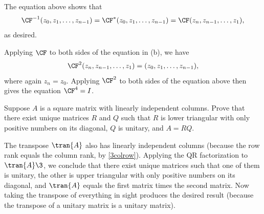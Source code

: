 \begin{Solution}
\begin{subtheorem}
The equation above shows that
\[
\CF^{-1}(z_0, z_1, \ldots, z_{n-1}) = \CF^*(z_0, z_1, \ldots, z_{n-1}) = \CF(z_n, z_{n-1}, \ldots, z_1),
\]
as desired.

\item
Applying $\CF$ to both sides of the equation in (b), we have
\[
\CF^2(z_n, z_{n-1}, \ldots, z_1) = (z_0, z_1, \ldots, z_{n-1}),
\]
where again $z_n = z_0$. Applying $\CF^2$ to both sides of the equation above then gives the equation $\CF^4 = I$.

\end{subtheorem}

\end{Solution}

\exercise
Suppose $A$ is a square matrix with linearly independent columns. Prove that there exist unique matrices $R$ and $Q$ such that $R$ is lower triangular with only positive numbers on its diagonal, $Q$ is unitary, and $A = RQ$.\label{7Cholt}

\begin{Solution}
The transpose $\tran{A}$ also has linearly independent columns (because the row rank equals the column rank, by \ref{3colrow}). Applying the QR factorization to $\tran{A}\3$, we conclude that there exist unique matrices such that one of them is unitary, the other is upper triangular with only positive numbers on its diagonal, and $\tran{A}$ equals the first matrix times the second matrix. Now taking the transpose of everything in sight produces the desired result (because the transpose of a unitary matrix is a unitary matrix).
\end{Solution}

